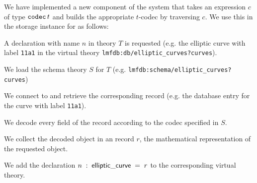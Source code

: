 We have implemented a new component of the \MMT system that takes an expression $c$ of type $\codec\, t$ and builds the appropriate $t$-codec by traversing $c$.
We use this in the storage instance for \LMFDB as follows:
\begin{compactenum}
 \item A declaration with name $n$ in theory $T$ is requested (e.g. the elliptic curve with label \texttt{11a1} in the virtual theory \texttt{lmfdb:db/elliptic\_curves?curves}).
 \item We load the schema theory $S$ for $T$ (e.g. \texttt{lmfdb:schema/elliptic\_curves?curves})
 \item We connect to \LMFDB and retrieve the corresponding record (e.g. the database entry for the curve with label \texttt{11a1}).
 \item We decode every field of the record according to the codec specified in $S$.
 \item We collect the decoded \MMT object in an \MMT record $r$, the mathematical representation of the requested object.
 \item We add the declaration $n\;:\;\cn{elliptic\_curve}\;=\;r$ to the corresponding virtual theory.
\end{compactenum}



